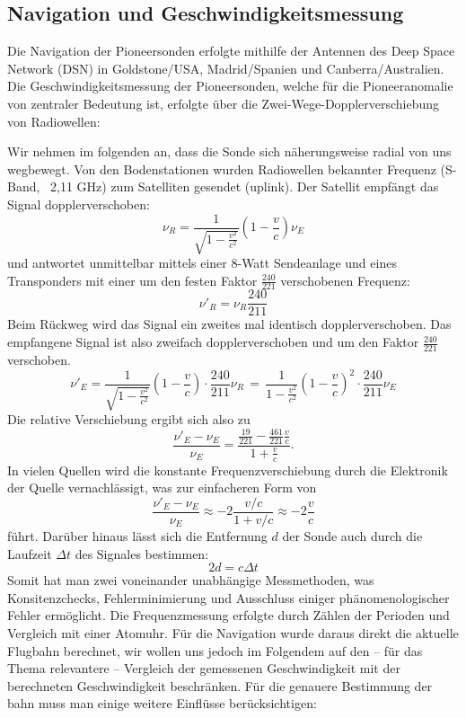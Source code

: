 
\subsection{Navigation und Geschwindigkeitsmessung}
Die Navigation der Pioneersonden erfolgte mithilfe der Antennen des Deep Space Network (DSN) in Goldstone/USA,
Madrid/Spanien und Canberra/Australien.
Die Geschwindigkeitsmessung der Pioneersonden, welche für die Pioneeranomalie von zentraler Bedeutung ist, erfolgte über
die Zwei-Wege-Dopplerverschiebung von Radiowellen:

Wir nehmen im folgenden an, dass die Sonde sich näherungsweise radial von uns wegbewegt.
Von den Bodenstationen wurden Radiowellen bekannter Frequenz (S-Band, ~2,11 GHz) zum Satelliten gesendet (uplink).
Der Satellit empfängt das Signal dopplerverschoben:
\begin{equation}
 \nu_R = \frac{1}{\sqrt{1-\frac{v^2}{c^2}}}(1-\frac{v}{c})\nu_E
\end{equation}
und antwortet unmittelbar mittels einer 8-Watt Sendeanlage und eines Transponders
mit einer um den festen Faktor $ \frac{240}{221} $ verschobenen Frequenz:
\begin{equation}
\nu'_R = \nu_R\frac{240}{211}
\end{equation}
Beim Rückweg wird das Signal ein zweites mal identisch dopplerverschoben.
Das empfangene Signal ist also zweifach dopplerverschoben und um den Faktor $\frac{240}{221}$ verschoben.
\begin{equation}
 \nu'_E = \frac{1}{\sqrt{1-\frac{v^2}{c^2}}}(1-\frac{v}{c}) \cdot \frac{240}{211}\nu_R \, = \,
\frac{1}{1-\frac{v^2}{c^2}}(1-\frac{v}{c})^2 \cdot \frac{240}{211} \nu_E
\end{equation}
Die relative Verschiebung ergibt sich also zu
\begin{equation}
 \frac{\nu'_E-\nu_E}{\nu_E} = \frac{\frac{19}{221}- \frac{461}{221}\frac{v}{c}}{1+\frac{v}{c}}.
\end{equation}
In vielen Quellen wird die konstante Frequenzverschiebung durch die Elektronik der Quelle vernachlässigt, was zur
einfacheren Form von
\begin{equation}
 \frac{\nu'_E-\nu_E}{\nu_E} \approx -2\frac{v/c}{1+v/c} \approx -2 \frac{v}{c}
\end{equation}
führt.
Darüber hinaus lässt sich die Entfernung $d$ der Sonde auch durch die Laufzeit $\Delta t$ des Signales bestimmen:
\begin{equation}
 2d = c \Delta t
\end{equation}
Somit hat man zwei voneinander unabhängige Messmethoden, was Konsitenzchecks,
Fehlerminimierung und Ausschluss einiger phänomenologischer Fehler ermöglicht.
Die Frequenzmessung erfolgte durch Zählen der Perioden und Vergleich mit einer Atomuhr.\cite{Nieto2007} %
Für die Navigation wurde daraus direkt die aktuelle Flugbahn berechnet, wir wollen uns jedoch im Folgendem auf den – für
das Thema relevantere – 
Vergleich der gemessenen Geschwindigkeit mit der berechneten Geschwindigkeit beschränken. %
Für die genauere Bestimmung der bahn muss man einige weitere Einflüsse berücksichtigen:

